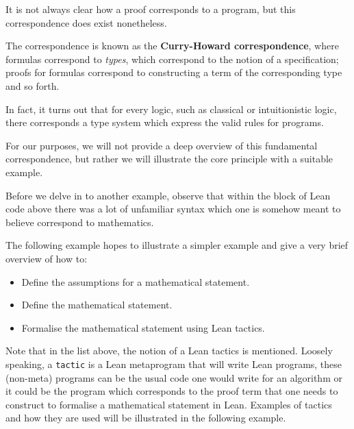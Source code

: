 It is not always clear how a proof corresponds to a program, but this correspondence does exist nonetheless.

The correspondence is known as the \textbf{Curry-Howard correspondence}, where formulas correspond to \textit{types}, which correspond to the notion of a specification;
proofs for formulas correspond to constructing a term of the corresponding type and so forth. 

In fact, it turns out that for every logic, such as classical or intuitionistic logic, there corresponds a type system which express the valid rules for programs. 

For our purposes, we will not provide a deep overview of this fundamental correspondence, but rather we will illustrate the core principle with a suitable example.

Before we delve in to another example, observe that within the block of Lean code above there was a lot of unfamiliar syntax which one is somehow meant to believe correspond to mathematics. 

The following example hopes to illustrate a simpler example and give a very brief overview of how to:

\begin{itemize}
    \item Define the assumptions for a mathematical statement.
    \item Define the mathematical statement.
    \item Formalise the mathematical statement using Lean tactics.
\end{itemize}

Note that in the list above, the notion of a Lean tactics is mentioned. Loosely speaking, a \texttt{tactic} is a Lean metaprogram that will write Lean programs, these (non-meta) programs can
be the usual code one would write for an algorithm or it could be the program which corresponds to the proof term that one needs to construct to formalise
a mathematical statement in Lean. Examples of tactics and how they are used will be illustrated in the following example.

